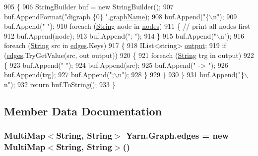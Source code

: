 \begin{DoxyCode}
905         \{
906             StringBuilder buf = \textcolor{keyword}{new} StringBuilder();
907             buf.AppendFormat(\textcolor{stringliteral}{"digraph \{0\} "},\hyperlink{a00103_a8605f1ec5a4e9cfd07d3ac2be042dac6}{graphName});
908             buf.Append(\textcolor{stringliteral}{"\{\(\backslash\)n"});
909             buf.Append(\textcolor{stringliteral}{"  "});
910             \textcolor{keywordflow}{foreach} (\hyperlink{a00048_a301aa7c866593a5b625a8fc158bbeacea27118326006d3829667a400ad23d5d98}{String} node \textcolor{keywordflow}{in} \hyperlink{a00103_a506df6f737a41748c01239bdea5d82b1}{nodes})
911             \{ \textcolor{comment}{// print all nodes first}
912                 buf.Append(node);
913                 buf.Append(\textcolor{stringliteral}{"; "});
914             \}
915             buf.Append(\textcolor{stringliteral}{"\(\backslash\)n"});
916             \textcolor{keywordflow}{foreach} (\hyperlink{a00048_a301aa7c866593a5b625a8fc158bbeacea27118326006d3829667a400ad23d5d98}{String} src \textcolor{keywordflow}{in} \hyperlink{a00103_a8adf7c937ab5c584b49698283e3da150}{edges}.Keys)
917             \{
918                 IList<string> \hyperlink{a00321_a3da6d48778c7b08a040bf24377f67792}{output};
919                 \textcolor{keywordflow}{if} (\hyperlink{a00103_a8adf7c937ab5c584b49698283e3da150}{edges}.TryGetValue(src, out output))
920                 \{
921                     \textcolor{keywordflow}{foreach} (\hyperlink{a00048_a301aa7c866593a5b625a8fc158bbeacea27118326006d3829667a400ad23d5d98}{String} trg \textcolor{keywordflow}{in} output)
922                     \{
923                         buf.Append(\textcolor{stringliteral}{"  "});
924                         buf.Append(src);
925                         buf.Append(\textcolor{stringliteral}{" -> "});
926                         buf.Append(trg);
927                         buf.Append(\textcolor{stringliteral}{";\(\backslash\)n"});
928                     \}
929                 \}
930             \}
931             buf.Append(\textcolor{stringliteral}{"\}\(\backslash\)n"});
932             \textcolor{keywordflow}{return} buf.ToString();
933         \}
\end{DoxyCode}


\subsection{Member Data Documentation}
\hypertarget{a00103_a8adf7c937ab5c584b49698283e3da150}{
\subsubsection[{edges}]{\setlength{\rightskip}{0pt plus 5cm}Multi\-Map$<${\bf String}, {\bf String}$>$ Yarn.\-Graph.\-edges = new Multi\-Map$<${\bf String}, {\bf String}$>$()}}\label{a00103_a8adf7c937ab5c584b49698283e3da150}


